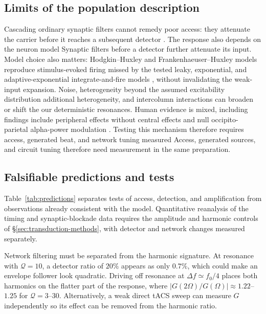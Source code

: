 \documentclass[11pt,a4paper]{article}
\providecommand{\DIFaddtex}[1]{{\protect\color{blue} \sf #1}} %
\providecommand{\DIFdeltex}[1]{{\protect\color{red} \scriptsize #1}} %
\providecommand{\DIFaddbegin}{} %
\providecommand{\DIFaddend}{} %
\providecommand{\DIFdelbegin}{} %
\providecommand{\DIFdelend}{} %
\providecommand{\DIFadd}[1]{\texorpdfstring{\DIFaddtex{#1}}{#1}} %
\providecommand{\DIFdel}[1]{\texorpdfstring{\DIFdeltex{#1}}{}} %
\begin{document}
\subsection{Limits of the population description}
\DIFdelbegin \DIFdel{Cascading ordinary synaptic filters cannot remedy poor access: they attenuate
the carrier before it reaches a subsequent detector .
The response also depends on the neuron model}\DIFdelend \DIFaddbegin \DIFadd{Synaptic filters before a detector further attenuate its input. Model choice
also matters}\DIFaddend : Hodgkin--Huxley and Frankenhaeuser--Huxley models reproduce
stimulus-evoked firing missed by the tested leaky, exponential, and
adaptive-exponential integrate-and-fire models \cite{plovie2025}\DIFdelbegin \DIFdel{, without invalidating the weak-input expansion}\DIFdelend .
Noise, \DIFdelbegin \DIFdel{heterogeneity beyond the assumed excitability distribution}\DIFdelend \DIFaddbegin \DIFadd{additional heterogeneity}\DIFaddend , and intercolumn interactions can broaden or
shift \DIFdelbegin \DIFdel{the }\DIFdelend \DIFaddbegin \DIFadd{our }\DIFaddend deterministic resonances. Human \DIFdelbegin \DIFdel{evidence
is mixed, including }\DIFdelend \DIFaddbegin \DIFadd{findings include }\DIFaddend peripheral effects
without central effects \cite{iszak2023} and null occipito-parietal alpha-power
modulation \cite{mansourinezhad2025}. \DIFdelbegin \DIFdel{Testing this mechanism therefore requires access, generated beat, and network
tuning measured }\DIFdelend \DIFaddbegin \DIFadd{Access, generated sources, and circuit
tuning therefore need measurement }\DIFaddend in the same preparation.

\subsection{Falsifiable predictions and tests}\label{sec:predictions}
Table~\ref{tab:predictions} separates tests of access, detection, and amplification
from observations already consistent with the model. Quantitative reanalysis of
the timing and synaptic-blockade data requires the amplitude and harmonic controls
of \S\ref{sec:transduction-methods}, with detector and network changes measured
separately.

Network filtering must be separated from the harmonic signature. At resonance
with $\mathcal Q=10$, a detector ratio of $20\%$ appears as only $0.7\%$,
which could make an envelope follower look quadratic. Driving off resonance
at $\Delta f\simeq f_0/4$ places both harmonics on the flatter part of the
response, where $|G(2\Omega)/G(\Omega)|\approx1.22$--$1.25$ for
$\mathcal Q=3$--$30$. Alternatively, a weak direct tACS sweep can measure
$G$ independently so its effect can be removed from the harmonic ratio.
\end{document}
